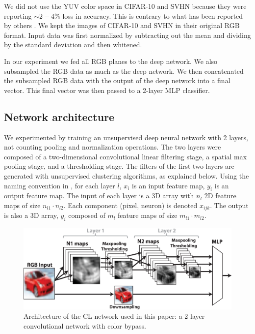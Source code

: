 \documentclass{article} %
\begin{document}
We did not use the YUV color space in CIFAR-10 and SVHN because they were reporting $\sim 2-4\%$ loss in accuracy.
This is contrary to what has been reported by others \cite{jarrett_what_2009}.
We kept the images of CIFAR-10 and SVHN in their original RGB format.
Input data was first normalized by subtracting out the mean and dividing by the standard deviation and then whitened.

In our experiment we fed all RGB planes to the deep network.
We also subsampled the RGB data as much as the deep network.
We then concatenated the subsampled RGB data with the output of the deep network into a final vector.
This final vector was then passed to a 2-layer MLP classifier.

\subsection{Network architecture}
\label{sec-net-arch}

We experimented by training an unsupervised deep neural network with 2 layers, not counting pooling and normalization operations.
The two layers were composed of a two-dimensional convolutional linear filtering stage, a spatial max pooling stage, and a thresholding stage. 
The filters of the first two layers are generated with unsupervised clustering algorithms, as explained below. 
Using the naming convention in \cite{lecun_convolutional_2010}, for each layer $l$, $x_i$ is an input feature map, $y_i$ is an output feature map.
The input of each layer is a 3D array with $n_l$ 2D feature maps of size $n_{l1} \cdot n_{l2}$.
Each component (pixel, neuron) is denoted $x_{ijk}$.
The output is also a 3D array, $y_i$ composed of $m_l$ feature maps of size $m_{l1} \cdot m_{l2}$.


\begin{figure}
\includegraphics[width=5in]{overall-structure.eps}
\caption{Architecture of the CL network used in this paper: a 2 layer convolutional network with color bypass.}
\label{fig-netarch}
\end{figure}
\end{document}
